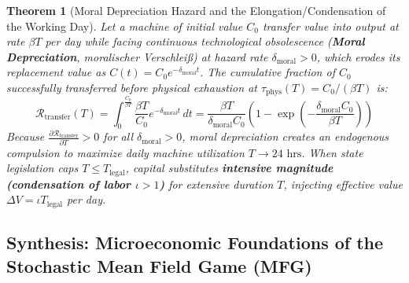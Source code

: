\documentclass[11pt,a4paper]{article}
\newtheorem{theorem}{Theorem}[section]
\begin{document}
\begin{theorem}[Moral Depreciation Hazard and the Elongation/Condensation of the Working Day]
Let a machine of initial value $C_0$ transfer value into output at rate $\beta T$ per day while facing continuous technological obsolescence (\textbf{Moral Depreciation}, \textit{moralischer Verschleiß}) at hazard rate $\delta_{\text{moral}} > 0$, which erodes its replacement value as $C(t) = C_0 e^{-\delta_{\text{moral}} t}$. The cumulative fraction of $C_0$ successfully transferred before physical exhaustion at $\tau_{\text{phys}}(T) = C_0 / (\beta T)$ is:
\begin{equation}
    \mathcal{R}_{\text{transfer}}(T) = \int_0^{\frac{C_0}{\beta T}} \frac{\beta T}{C_0} e^{-\delta_{\text{moral}} t} \, dt = \frac{\beta T}{\delta_{\text{moral}} C_0} \left(1 - \exp\!\left(-\frac{\delta_{\text{moral}} C_0}{\beta T}\right)\right)
\end{equation}
Because $\frac{\partial \mathcal{R}_{\text{transfer}}}{\partial T} > 0$ for all $\delta_{\text{moral}} > 0$, moral depreciation creates an endogenous compulsion to maximize daily machine utilization $T \to 24\text{ hrs}$. When state legislation caps $T \le T_{\text{legal}}$, capital substitutes \textbf{intensive magnitude (condensation of labor $\iota > 1$)} for extensive duration $T$, injecting effective value $\Delta V = \iota T_{\text{legal}}$ per day.
\end{theorem}

\subsection{Synthesis: Microeconomic Foundations of the Stochastic Mean Field Game (MFG)}
\end{document}
